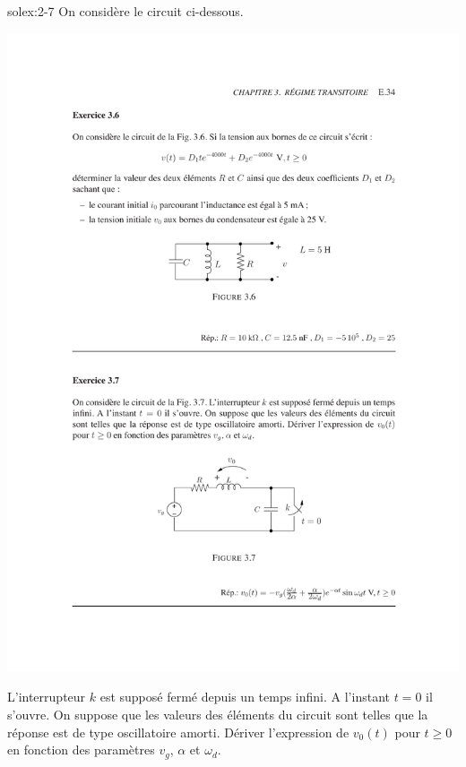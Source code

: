 \begin{exwithsol}{solex:2-7}
	\label{ex:2-7}
On consid\`ere le circuit ci-dessous. 
\begin{center}
	\includegraphics[width=0.5\linewidth]{exercices/ex-3-7}
\end{center}
L'interrupteur
$k$ est suppos\'e ferm\'e depuis un temps infini. A l'instant $t=0$ il
s'ouvre. On suppose que les valeurs des \'el\'ements du circuit sont telles
que la r\'eponse est de type oscillatoire amorti.  D\'eriver l'expression
de $v_0(t)$ pour $t\geq 0$ en fonction des param\`etres $v_g$, $\alpha$ et 
$\omega_d$.

\end{exwithsol}

